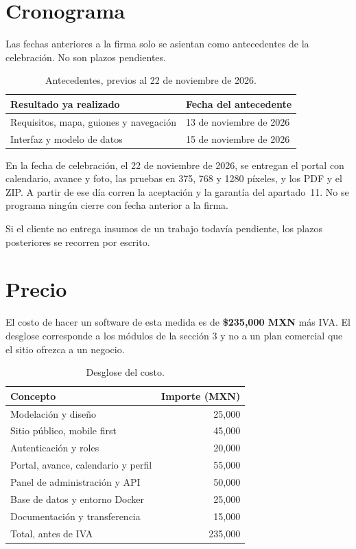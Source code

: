 \section{Cronograma}

Las fechas anteriores a la firma solo se asientan como antecedentes de la
celebración. No son plazos pendientes.

\begin{table}[H]
  \centering
  \caption{Antecedentes, previos al 22 de noviembre de 2026.}
  \begin{tabularx}{\textwidth}{@{}Y l@{}}
    \toprule
    Resultado ya realizado & Fecha del antecedente \\
    \midrule
    Requisitos, mapa, guiones y navegación & 13 de noviembre de 2026 \\
    Interfaz y modelo de datos & 15 de noviembre de 2026 \\
    \bottomrule
  \end{tabularx}
\end{table}

En la fecha de celebración, el 22 de noviembre de 2026, se entregan el portal
con calendario, avance y foto, las pruebas en 375, 768 y 1280 píxeles, y los
PDF y el ZIP. A partir de ese día corren la aceptación y la garantía del
apartado~11. No se programa ningún cierre con fecha anterior a la firma.

Si el cliente no entrega insumos de un trabajo todavía pendiente, los plazos
posteriores se recorren por escrito.

\section{Precio}

El costo de hacer un software de esta medida es de \textbf{\$235{,}000 MXN}
más IVA. El desglose corresponde a los módulos de la sección 3 y no a un plan
comercial que el sitio ofrezca a un negocio.

\begin{table}[H]
  \centering
  \caption{Desglose del costo.}
  \label{tab:costo}
  \begin{tabular}{lr}
    \toprule
    Concepto & Importe (MXN) \\
    \midrule
    Modelación y diseño & 25{,}000 \\
    Sitio público, mobile first & 45{,}000 \\
    Autenticación y roles & 20{,}000 \\
    Portal, avance, calendario y perfil & 55{,}000 \\
    Panel de administración y API & 50{,}000 \\
    Base de datos y entorno Docker & 25{,}000 \\
    Documentación y transferencia & 15{,}000 \\
    \midrule
    Total, antes de IVA & 235{,}000 \\
    \bottomrule
  \end{tabular}
\end{table}


